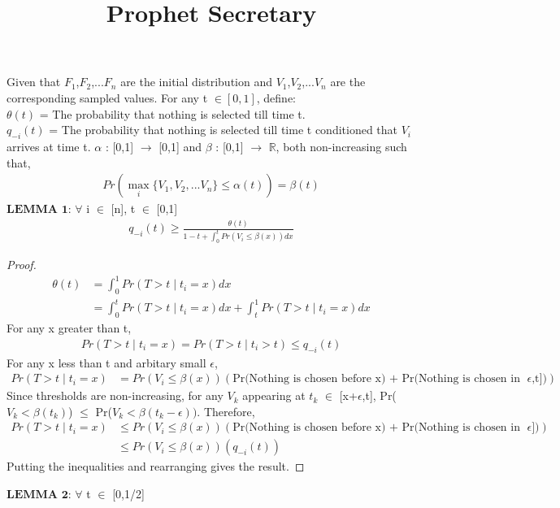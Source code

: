 \documentclass[12pt, letterpaper, twoside]{article}
\title{Prophet Secretary}
\begin{document}
\maketitle
Given that $F_{1}$,$F_{2}$,...$F_{n}$ are the initial distribution and $V_{1}$,$V_{2}$,...$V_{n}$ are the corresponding sampled values. For any t $\in [0,1] $, define:\\
$\theta(t)$ = The probability that nothing is selected till time t.\\
$q_{-i}(t)$ = The probability that nothing is selected till time t conditioned that $V_{i}$ arrives at time t.
$\alpha$ : [0,1] $\rightarrow$ [0,1] and $\beta$ : [0,1] $\rightarrow$ $\mathbb{R}$, both non-increasing such that,
\begin{align*}
Pr(\max_{i} \{V_{1},V_{2},...V_{n}\} \leq \alpha(t)) = \beta(t)
\end{align*}
$\textbf{LEMMA 1:}$ $\forall$ i $\in$ [n], t $\in$ [0,1]
\begin{align*}
q_{-i}(t) \geq \frac{\theta(t)}{1-t+\int_{0}^{t} Pr(V_{i} \leq \beta(x))  dx}
\end{align*}
\begin{proof}
\begin{align*}
\theta(t) &= \int_{0}^{1} Pr(T > t \mid t_{i} = x) dx\\
&= \int_{0}^{t} Pr(T > t \mid t_{i} = x) dx + \int_{t}^{1} Pr(T > t \mid t_{i} = x) dx
\end{align*}
For any x greater than t,
\begin{align*}
Pr(T > t \mid t_{i} = x) = Pr(T > t \mid t_{i} > t) \leq q_{-i}(t)
\end{align*}
For any x less than t and arbitary small $\epsilon$,
\begin{align*}
Pr(T > t \mid t_{i} = x) &= Pr(V_{i} \leq \beta(x)) (\text{Pr(Nothing is chosen before x) + Pr(Nothing is chosen in [x+$\epsilon$,t])})
\end{align*}
Since thresholds are non-increasing, for any $V_{k}$ appearing at $t_{k}$ $\in$ [x+$\epsilon$,t], Pr($V_{k} < \beta(t_{k})$) $\leq$ Pr($V_{k} < \beta(t_{k}-\epsilon))$. Therefore,
\begin{align*}
Pr(T > t \mid t_{i} = x) &\leq Pr(V_{i} \leq \beta(x)) (\text{Pr(Nothing is chosen before x) + Pr(Nothing is chosen in [x,t-$\epsilon$])})\\
&\leq Pr(V_{i} \leq \beta(x)) (q_{-i}(t))
\end{align*}
Putting the inequalities and rearranging gives the result.
\end{proof}
$\textbf{LEMMA 2:}$ $\forall$ t $\in$ [0,1/2]
\end{document}
